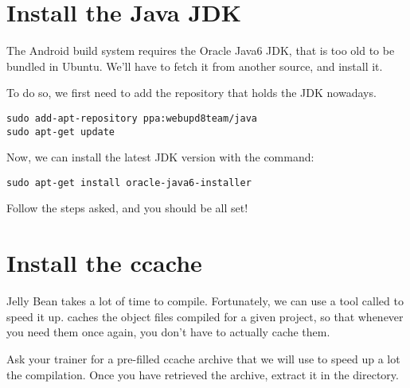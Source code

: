 \section{Install the Java JDK}

The Android build system requires the Oracle Java6 JDK, that is too
old to be bundled in Ubuntu. We'll have to fetch it from another
source, and install it.

To do so, we first need to add the repository that holds the JDK
nowadays.

\begin{verbatim}
sudo add-apt-repository ppa:webupd8team/java
sudo apt-get update
\end{verbatim}

Now, we can install the latest JDK version with the command:
\begin{verbatim}
sudo apt-get install oracle-java6-installer
\end{verbatim}

Follow the steps asked, and you should be all set!

\section{Install the ccache}

Jelly Bean takes a lot of time to compile. Fortunately, we can use a
tool called  to speed it up.  caches the
object files compiled for a given project, so that whenever you need
them once again, you don't have to actually cache them.

Ask your trainer for a pre-filled ccache archive that we will use to
speed up a lot the compilation. Once you have retrieved the archive,
extract it in the  directory.

